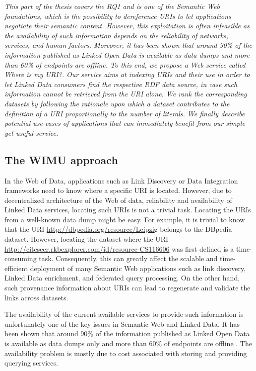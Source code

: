\textit{This part of the thesis covers the RQ1 and is one of the Semantic Web foundations, which is the possibility to dereference URIs to let applications negotiate their semantic content.
However, this exploitation is often infeasible as the availability of such information depends on the reliability of networks, services, and human factors.
Moreover, it has been shown that around 90\% of the information published as Linked Open Data is available as data dumps and more than 60\% of endpoints are offline.
To this end, we propose a Web service called \textit{Where is my URI?}.
Our service aims at indexing URIs and their use in order to let Linked Data consumers find the respective RDF data source, in case such information cannot be retrieved from the URI alone.
We rank the corresponding datasets by following the rationale upon which a dataset contributes to the definition of a URI proportionally to the number of literals.
We finally describe potential use-cases of applications that can immediately benefit from our simple yet useful service.}

\subsection{The WIMU approach}
In the Web of Data, applications such as Link Discovery or Data Integration frameworks need to know where a specific URI is located.
However, due to decentralized architecture of the Web of data, reliability and availability of Linked Data services, locating such URIs is not a trivial task.
Locating the URIs from a well-known data dump might be easy. 
For example, it is trivial to know that the URI \url{http://dbpedia.org/resource/Leipzig} belongs to the DBpedia dataset. 
However, locating the dataset where the URI \url{http://citeseer.rkbexplorer.com/id/resource-CS116606} was first defined is a time-consuming task. 
Consequently, this can greatly affect the scalable and time-efficient deployment of many Semantic Web applications such as link discovery, Linked Data enrichment, and federated query processing.
On the other hand, such provenance information about URIs can lead to regenerate and validate the links across datasets.

The availability of the current available services to provide such information is unfortunately one of the key issues in Semantic Web and Linked Data.
It has been shown that around 90\% of the information published as Linked Open Data is available as data dumps only and more than 60\% of endpoints are offline \cite{vandenbussche2017sparqles}.
The availability problem is mostly due to cost associated with storing and providing querying services.%

